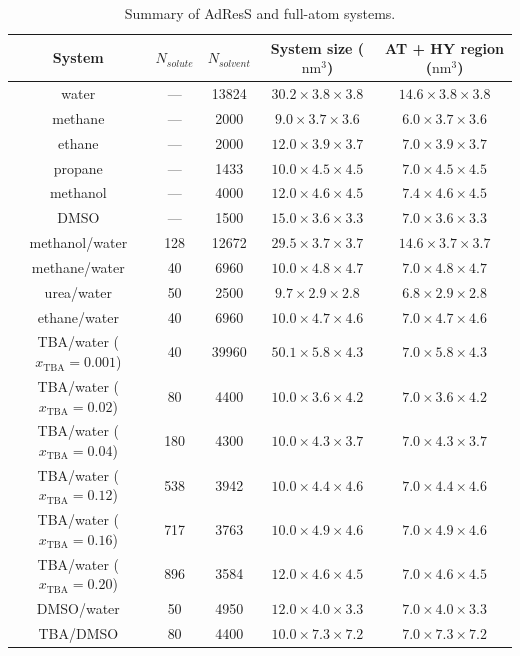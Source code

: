 \documentclass[a4paper,preprint,unsortedaddress]{revtex4-1}
\newcommand{\recheck}[1]{{\color{red} #1}}
\newcommand{\concenttba}{x_{\textrm{TBA}}}
\begin{document}
\begin{table}[]
\begin{center}
\begin{tabular}{ccccc}
\hline \hline
 System & $N_{solute}$ & $N_{solvent}$ & System size ($\textrm{nm}^{3}$) &  AT + HY region ($\textrm{nm}^{3}$)  \\
\hline
\recheck{water} & --- & 13824 & $30.2 \times 3.8 \times 3.8$ & $14.6 \times 3.8 \times 3.8$ \\
methane & --- & 2000 & $9.0 \times  3.7 \times 3.6$ & $6.0 \times 3.7 \times 3.6$ \\
ethane & --- & 2000 & $12.0 \times 3.9 \times 3.7$ & $7.0 \times 3.9 \times 3.7$ \\
propane & --- & 1433 & $10.0 \times 4.5 \times 4.5$ & $7.0 \times 4.5 \times 4.5$ \\
\recheck{methanol} & --- & 4000 & $12.0 \times 4.6 \times 4.5$ & $7.4 \times 4.6 \times 4.5$ \\
DMSO & --- & 1500 & $15.0 \times 3.6 \times 3.3$ &  $7.0 \times 3.6 \times 3.3$ \\
\recheck{methanol/water} & 128 & 12672 & $29.5 \times 3.7 \times 3.7$ & $14.6 \times 3.7 \times 3.7$ \\
\recheck{methane/water} & 40  & 6960 & $10.0 \times 4.8 \times 4.7$ & $7.0 \times 4.8 \times 4.7$ \\
urea/water & 50 & 2500 & $9.7 \times 2.9 \times 2.8$ & $6.8 \times 2.9 \times 2.8$ \\
\recheck{ethane/water} & 40 & 6960 & $10.0 \times 4.7 \times 4.6$ & $7.0 \times 4.7 \times 4.6$ \\
\recheck{TBA/water ($\concenttba=0.001$)} & 40 & 39960 & $50.1 \times 5.8 \times 4.3$ & $7.0 \times 5.8 \times 4.3$  \\
\recheck{TBA/water ($\concenttba=0.02$)} & 80 & 4400 & $10.0 \times 3.6 \times 4.2$ & $7.0 \times 3.6 \times 4.2$  \\
\recheck{TBA/water ($\concenttba=0.04$)} & 180 & 4300 & $10.0 \times 4.3 \times 3.7$ & $7.0 \times 4.3 \times 3.7$  \\
\recheck{TBA/water ($\concenttba=0.12$)} & 538 & 3942 & $10.0 \times 4.4 \times 4.6$ & $7.0 \times 4.4 \times 4.6$  \\
\recheck{TBA/water ($\concenttba=0.16$)} & 717 & 3763 & $10.0 \times 4.9 \times 4.6$ & $7.0 \times 4.9 \times 4.6$  \\
\recheck{TBA/water ($\concenttba=0.20$)} & 896 & 3584 & $12.0 \times 4.6 \times 4.5$ & $7.0 \times 4.6 \times 4.5$  \\
DMSO/water & 50 & 4950 & $12.0 \times 4.0 \times 3.3$ & $7.0 \times 4.0 \times 3.3$ \\
TBA/DMSO & 80 & 4400 & $10.0 \times 7.3 \times 7.2$ &  $7.0 \times 7.3 \times 7.2$ \\
\hline \hline
\end{tabular}
\caption{Summary of AdResS and full-atom systems.}
\label{table2}
\end{center}
\end{table}
\end{document}
